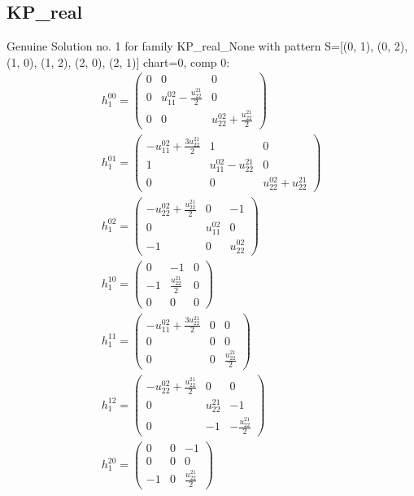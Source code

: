 \documentclass[a4paper, 11pt, twoside, onecolumn]{article}
\begin{document}
\begin{landscape}
\section{KP\_real}
Genuine Solution no. 1 for family KP_real_None with pattern S=[(0, 1), (0, 2), (1, 0), (1, 2), (2, 0), (2, 1)] chart=0, comp 0: 
\begin{gather*} 
	 h_{1}^{00}=\begin{pmatrix}0 & 0 & 0\\0 & u^{02}_{11} - \frac{u^{21}_{22}}{2} & 0\\0 & 0 & u^{02}_{22} + \frac{u^{21}_{22}}{2}\end{pmatrix}\\ 
	 h_{1}^{01}=\begin{pmatrix}- u^{02}_{11} + \frac{3 u^{21}_{22}}{2} & 1 & 0\\1 & u^{02}_{11} - u^{21}_{22} & 0\\0 & 0 & u^{02}_{22} + u^{21}_{22}\end{pmatrix}\\ 
	 h_{1}^{02}=\begin{pmatrix}- u^{02}_{22} + \frac{u^{21}_{22}}{2} & 0 & -1\\0 & u^{02}_{11} & 0\\-1 & 0 & u^{02}_{22}\end{pmatrix}\\ 
	 h_{1}^{10}=\begin{pmatrix}0 & -1 & 0\\-1 & \frac{u^{21}_{22}}{2} & 0\\0 & 0 & 0\end{pmatrix}\\ 
	 h_{1}^{11}=\begin{pmatrix}- u^{02}_{11} + \frac{3 u^{21}_{22}}{2} & 0 & 0\\0 & 0 & 0\\0 & 0 & \frac{u^{21}_{22}}{2}\end{pmatrix}\\ 
	 h_{1}^{12}=\begin{pmatrix}- u^{02}_{22} + \frac{u^{21}_{22}}{2} & 0 & 0\\0 & u^{21}_{22} & -1\\0 & -1 & - \frac{u^{21}_{22}}{2}\end{pmatrix}\\ 
	 h_{1}^{20}=\begin{pmatrix}0 & 0 & -1\\0 & 0 & 0\\-1 & 0 & \frac{u^{21}_{22}}{2}\end{pmatrix}\\ 

\end{gather*}
\end{landscape}
\end{document}
